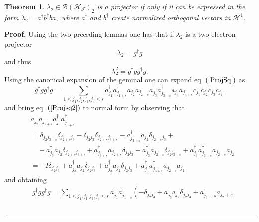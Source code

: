 \documentclass[aps,preprint]{revtex4}%
\newtheorem{theorem}{Theorem}
\newenvironment{proof}[1][Proof]{\noindent\textbf{#1.} }{\ \rule{0.5em}{0.5em}}
\begin{document}
\begin{theorem}
\bigskip$\lambda_{2}\in\mathcal{B}\left(  \mathcal{H}_{\mathcal{F}}\right)
_{2}$ is a projector if only if it can be expressed in the form $\lambda
_{2}=a^{\dagger}b^{\dagger}ba,$ where $a^{\dagger}$ and $b^{\dagger}$ create
normalized orthogonal vectors in $\mathcal{H}^{1}.$
\end{theorem}

\begin{proof}
Using the two preceding lemmas one has that if $\lambda_{2}$ is a two electron
projector
\begin{equation}
\lambda_{2}=g^{\dagger}g\nonumber
\end{equation}
and thus
\begin{equation}
\lambda_{2}^{2}=g^{\dagger}gg^{\dagger}g. \label{ProjSq}%
\end{equation}
Using the canonical expansion of the geminal one can expand eq. $\left(
\ref{ProjSq}\right)  $ as
\begin{equation}
g^{\dagger}gg^{\dagger}g=\sum_{1\leq j_{1},j_{2},j_{3},j_{4}\leq s}a_{j_{1}%
}^{\dagger}a_{j_{1+s}}^{\dagger}a_{j_{2}}a_{j_{2+s}}a_{j_{3}}^{\dagger
}a_{j_{3+s}}^{\dagger}a_{j_{4}}a_{j_{4+s}}c_{j_{1}}c_{j_{2}}c_{j_{3}}c_{j_{4}%
}. \label{Projsq2}%
\end{equation}
and bring eq. $\left(  \ref{Projsq2}\right)  $ to normal form by observing
that
\begin{align}
&  a_{j_{2}}a_{j_{2+s}}a_{j_{3}}^{\dagger}a_{j_{3+s}}^{\dagger}\nonumber\\
&  =\delta_{j_{2}j_{3+s}}\delta_{j_{2+s}j_{3}}-\delta_{j_{2}j_{3}}%
\delta_{j_{2+s}j_{3+s}}-a_{j_{3+s}}^{\dagger}a_{j_{2}}\delta_{j_{2+s}j_{3}%
}+\nonumber\\
&  \quad+a_{j_{3}}^{\dagger}a_{j_{2}}\delta_{j_{2+s}j_{3+s}}+a_{j_{3+s}%
}^{\dagger}a_{j_{2+s}}\delta_{j_{2}j_{3}}-a_{j_{3}}^{\dagger}a_{j_{2+s}}%
\delta_{j_{2}j_{3+s}}+a_{j_{3}}^{\dagger}a_{j_{3+s}}^{\dagger}a_{j_{2+s}%
}a_{j_{2}}\nonumber\\
&  =-I\delta_{j_{2}j_{3}}+a_{j_{3}}^{\dagger}a_{j_{2}}\delta_{j_{2}j_{3}%
}+a_{j_{3}}^{\dagger}a_{j_{2}}\delta_{j_{2}j_{3}}+a_{j_{3}}^{\dagger
}a_{j_{3+s}}^{\dagger}a_{j_{2+s}}a_{j_{2}}%
\end{align}
and obtaining%
\begin{align}
&  g^{\dagger}gg^{\dagger}g=\sum_{1\leq j_{1},j_{2},j_{3},j_{4}\leq s}%
a_{j_{1}}^{\dagger}a_{j_{1+s}}^{\dagger}\left(  -\delta_{j_{2}j_{3}}+a_{j_{3}%
}^{\dagger}a_{j_{2}}\delta_{j_{2}j_{3}}+a_{j_{3}+s}^{\dagger}a_{j_{2}+s}%

\end{align}
\end{proof}
\end{document}
